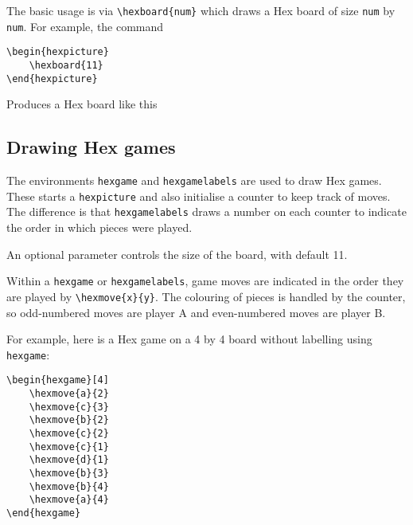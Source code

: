 \documentclass[a4paper,12pt]{article}
\begin{document}
    The basic usage is via \verb|\hexboard{num}| which draws a Hex board of size \verb|num| by \verb|num|. For example, the command
    
    \begin{verbatim}\begin{hexpicture}
    \hexboard{11}
\end{hexpicture}\end{verbatim}
    
    Produces a Hex board like this\\
    
    \begin{hexpicture}
    \end{hexpicture}

    \subsection{Drawing Hex games}
    
    The environments \verb|hexgame| and \verb|hexgamelabels| are used to draw Hex games. These starts a \verb|hexpicture| and also initialise a counter to keep track of moves. The difference is that \verb|hexgamelabels| draws a number on each counter to indicate the order in which pieces were played. 
    
    An optional parameter controls the size of the board, with default 11. 
    
    Within a \verb|hexgame| or \verb|hexgamelabels|, game moves are indicated in the order they are played by \verb|\hexmove{x}{y}|. The colouring of pieces is handled by the counter, so odd-numbered moves are player A and even-numbered moves are player B.
    
    For example, here is a Hex game on a 4 by 4 board without labelling using \verb|hexgame|:
    
    \begin{verbatim}\begin{hexgame}[4]
    \hexmove{a}{2}
    \hexmove{c}{3}
    \hexmove{b}{2}
    \hexmove{c}{2}
    \hexmove{c}{1}
    \hexmove{d}{1}
    \hexmove{b}{3}
    \hexmove{b}{4}
    \hexmove{a}{4}
\end{hexgame}\end{verbatim}
    
    \begin{hexgame}[4]
    \end{hexgame}
    
\end{document}

